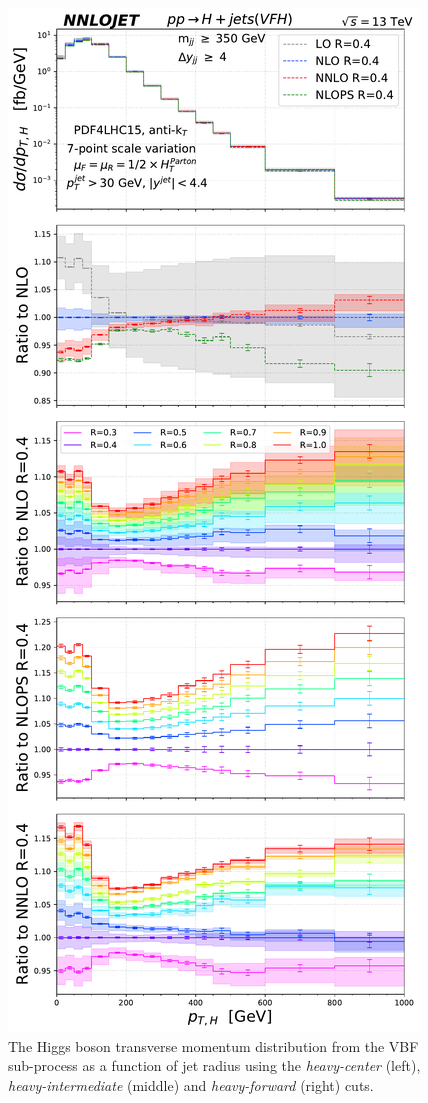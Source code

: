 \documentclass[10pt,prd,fleqn,superscriptaddress,notitlepage,nofootinbib,preprintnumbers,nobalancelastpage]{revtex4-1}
\newcommand{\VBF}{VBF\xspace}
\begin{document}
\begin{figure}[t]
\includegraphics[scale=0.3]{figures/rdep/LH19VFH_pth_largebin_heavy_forward.pdf}
\caption{The Higgs boson transverse momentum distribution from the \VBF sub-process as a function of jet radius using the \textit{heavy-center} (left), \textit{heavy-intermediate} (middle) and \textit{heavy-forward} (right) cuts.}
\label{fig:fig_Higgs_pT_NNLO_large_heavy-center}
\end{figure}
\end{document}
